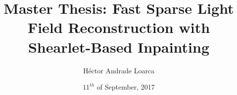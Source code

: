 \title[Fast Sparse Light Field Reconstruction with Shearlet-Based Inpainting]{Master Thesis: Fast Sparse Light Field Reconstruction with Shearlet-Based Inpainting}
\author{H\'ector Andrade Loarca}
\date{$11^{th}$ of September, 2017}

\newcommand{\mylogo}{\texttt{[image: Images/bms-logo-button.png]}}

\begin{frame}[plain]
	\titlepage
\end{frame}


